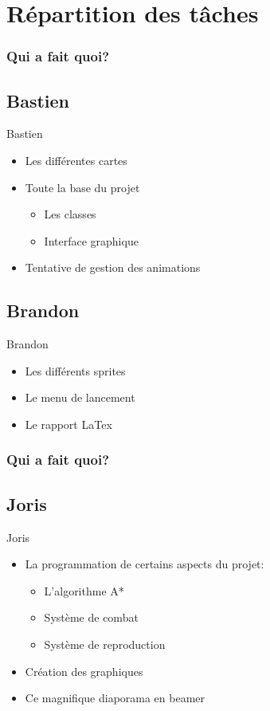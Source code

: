 \documentclass{beamer}
\begin{document}
\section{Répartition des tâches}

\begin{frame} \frametitle{Qui a fait quoi?}
	\subsection{Bastien}
	\begin{block}{Bastien}
		\begin{itemize}
			\item Les différentes cartes
			\item Toute la base du projet
				\begin{itemize}
					\item Les classes
					\item Interface graphique
				\end{itemize}
			\item Tentative de gestion des animations
		\end{itemize}
	\end{block}
	\subsection{Brandon}
	\begin{block}{Brandon}
		\begin{itemize}
			\item Les différents sprites
			\item Le menu de lancement
			\item Le rapport LaTex
		\end{itemize}
	\end{block}
\end{frame}

\begin{frame} \frametitle{Qui a fait quoi?}
	\subsection{Joris}
	\begin{block}{Joris} 
		\begin{itemize}
			\item La programmation de certains aspects du projet:
				\begin{itemize}
					\item L'algorithme A*
					\item Système de combat
					\item Système de reproduction
				\end{itemize}
			\item Création des graphiques
			\item Ce magnifique diaporama en beamer
		\end{itemize}
	\end{block}
\end{frame}
\end{document}
